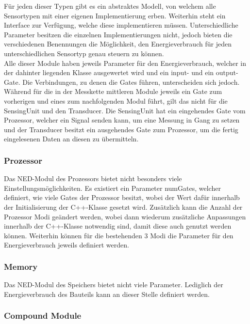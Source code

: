 Für jeden dieser Typen gibt es ein abstraktes Modell, von welchem alle Sensortypen mit einer eigenen Implementierung erben. Weiterhin steht ein Interface zur Verfügung, welche diese implementieren müssen. Unterschiedliche Parameter besitzen die einzelnen Implementierungen nicht, jedoch bieten die verschiedenen Benennungen die Möglichkeit, den Energieverbrauch für jeden unterschiedlichen Sensortyp genau steuern zu können.\\
Alle dieser Module haben jeweils Parameter für den Energieverbrauch, welcher in der dahinter liegenden Klasse ausgewertet wird und ein input- und ein output-Gate. Die Verbindungen, zu denen die Gates führen, unterscheiden sich jedoch.\\
Während für die in der Messkette mittleren Module jeweils ein Gate zum vorherigen und eines zum nachfolgenden Modul führt, gilt das nicht für die SensingUnit und den Transducer. Die SensingUnit hat ein eingehendes Gate vom Prozessor, welcher ein Signal senden kann, um eine Messung in Gang zu setzen und der Transducer besitzt ein ausgehendes Gate zum Prozessor, um die fertig eingelesenen Daten an diesen zu übermitteln.

\subsubsection{Prozessor}

Das NED-Modul des Prozessors bietet nicht besonders viele Einstellungsmöglichkeiten. Es existiert ein Parameter numGates, welcher definiert, wie viele Gates der Prozessor besitzt, wobei der Wert dafür innerhalb der Initialisierung der C++-Klasse gesetzt wird. Zusätzlich kann die Anzahl der Prozessor Modi geändert werden, wobei dann wiederum zusätzliche Anpassungen innerhalb der C++-Klasse notwendig sind, damit diese auch genutzt werden können. Weiterhin können für die bestehenden 3 Modi die Parameter für den Energieverbrauch jeweils definiert werden.

\subsubsection{Memory}

Das NED-Modul des Speichers bietet nicht viele Parameter. Lediglich der Energieverbrauch des Bauteils kann an dieser Stelle definiert werden.

\subsubsection{Compound Module}

